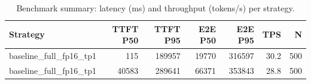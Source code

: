 \begin{table}
\caption{Benchmark summary: latency (ms) and throughput (tokens/s) per strategy.}
\label{tab:summary}
\begin{tabular}{lrrrrrr}
\toprule
Strategy & TTFT P50 & TTFT P95 & E2E P50 & E2E P95 & TPS & N \\
\midrule
baseline_full_fp16_tp1 & 115 & 189957 & 19770 & 316597 & 30.2 & 500 \\
baseline_full_fp16_tp1 & 40583 & 289641 & 66371 & 353843 & 28.8 & 500 \\
\bottomrule
\end{tabular}
\end{table}

